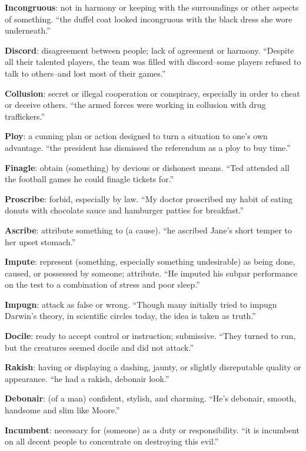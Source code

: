 \documentclass[12pt, a4paper]{ximera}
\begin{document}
\textbf{Incongruous}: not in harmony or keeping with the surroundings or other aspects of something. ``the duffel coat looked incongruous with the black dress she wore underneath.''

\textbf{Discord}: disagreement between people; lack of agreement or harmony. ``Despite all their talented players, the team was filled with discord--some players refused to talk to others--and lost most of their games.''

\textbf{Collusion}: secret or illegal cooperation or conspiracy, especially in order to cheat or deceive others. ``the armed forces were working in collusion with drug traffickers.''

\textbf{Ploy}: a cunning plan or action designed to turn a situation to one's own advantage.  ``the president has dismissed the referendum as a ploy to buy time.''

\textbf{Finagle}: obtain (something) by devious or dishonest means. ``Ted attended all the football games he could finagle tickets for.''

\textbf{Proscribe}: forbid, especially by law. ``My doctor proscribed my habit of eating donuts with chocolate sauce and hamburger patties for breakfast.''

\textbf{Ascribe}: attribute something to (a cause). ``he ascribed Jane's short temper to her upset stomach.''

\textbf{Impute}: represent (something, especially something undesirable) as being done, caused, or possessed by someone; attribute. ``He imputed his subpar performance on the test to a combination of stress and poor sleep.''

\textbf{Impugn}: attack as false or wrong. ``Though many initially tried to impugn Darwin's theory, in scientific circles today, the idea is taken as truth.''

\textbf{Docile}: ready to accept control or instruction; submissive. ``They turned to run, but the creatures seemed docile and did not attack.''

\textbf{Rakish}: having or displaying a dashing, jaunty, or slightly disreputable quality or appearance. ``he had a rakish, debonair look.''

\textbf{Debonair}: (of a man) confident, stylish, and charming. ``He's debonair, smooth, handsome and slim like Moore.''

\textbf{Incumbent}: necessary for (someone) as a duty or responsibility. ``it is incumbent on all decent people to concentrate on destroying this evil.''
\end{document}
